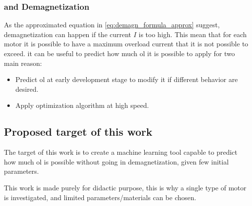 \subsubsection{\texorpdfstring{}{Overload} and Demagnetization}
As the approximated equation in \cref{eq:demagn_formula_approx} suggest, demagnetization can happen if the current $I$ is too high. This mean that for each motor it is possible to have a maximum overload current that it is not possible to exceed.
it can be useful to predict how much \gls{ol} it is possible to apply for two main reason:
\begin{itemize}
    \item Predict \gls{ol} at early development stage to modify it if different behavior are desired.
    \item Apply optimization algorithm at high speed.
\end{itemize}
\subsection{Proposed target of this work}
The target of this work is to create a machine learning tool capable to predict how much \gls{ol} is possible without going in demagnetization, given few initial parameters.

This work is made purely for didactic purpose, this is why a single type of motor is investigated, and limited parameters/materials can be chosen.

